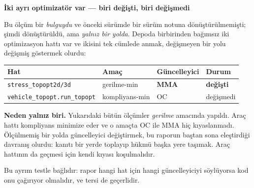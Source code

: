 \documentclass[11pt,a4paper]{article}
\newcommand{\kkkenar}{lacivert}
\newcommand{\kkzemin}{kod}
\newenvironment{renkkutu}[3]{%
  \renewcommand{\kkkenar}{#1}\renewcommand{\kkzemin}{#2}%
  \par\medskip\noindent
  \begin{lrbox}{\kutugovde}%
  \begin{minipage}{\dimexpr\linewidth-2\fboxsep-2\fboxrule\relax}\footnotesize
  \textcolor{#1}{\textbf{#3}}\par\vspace{3pt}%
}{%
  \end{minipage}%
  \end{lrbox}%
  \noindent\fcolorbox{\kkkenar}{\kkzemin}{\usebox{\kutugovde}}%
  \par\medskip
}
\newenvironment{dikkat}[1]{\begin{renkkutu}{orta}{ortabg}{#1}}{\end{renkkutu}}
\begin{document}
\begin{dikkat}{İki ayrı optimizatör var --- biri değişti, biri değişmedi}
Bu ölçüm bir \emph{bulguydu} ve önceki sürümde bir sürüm notuna
dönüştürülmemişti; şimdi dönüştürüldü, ama \emph{yalnız bir yolda}. Depoda
birbirinden bağımsız iki optimizasyon hattı var ve ikisini tek cümlede
anmak, değişmeyen bir yolu değişmiş göstermek olurdu:

\begin{center}\footnotesize
\begin{tabular}{@{}llll@{}}
\toprule
Hat & Amaç & Güncelleyici & Durum \\
\midrule
\texttt{stress\_topopt2d/3d} & gerilme-min & \textbf{MMA} & \textbf{değişti} \\
\texttt{vehicle\_topopt.run\_topopt} & kompliyans-min & OC & değişmedi \\
\bottomrule
\end{tabular}
\end{center}

\noindent \textbf{Neden yalnız biri.} Yukarıdaki bütün ölçümler
\emph{gerilme} amacında yapıldı. Araç hattı kompliyans minimize eder ve o
amaçta OC ile MMA hiç kıyaslanmadı. Ölçülmemiş bir yolda güncelleyici
değiştirmek, bu raporun baştan sona eleştirdiği davranış olurdu: kanıtı bir
yerde toplayıp hükmü başka yere taşımak. Araç hattının da geçmesi için kendi
kıyası koşulmalıdır.

Bu ayrım testle bağlıdır: rapor hangi hat için hangi güncelleyiciyi
söylüyorsa kod onu çağırıyor olmalıdır, ve tersi de geçerlidir.
\end{dikkat}
\end{document}
